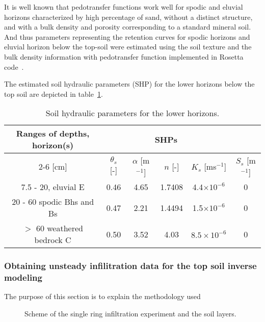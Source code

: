 \documentclass[review]{myarticle}
\begin{document}
It is well known that pedotransfer functions work well for spodic and eluvial horizons characterized by high percentage of sand, without a distinct structure, and with a bulk density and porosity corresponding to a standard mineral soil. And thus parameters representing the retention curves for spodic horizons and eluvial horizon below the top-soil were estimated using the soil texture and the bulk density information with pedotransfer function implemented in Rosetta code~\citep{Schaap}.

The estimated soil hydraulic parameters (SHP) for the lower horizons below the top soil are depicted in table~\ref{tab_SHP}.

\begin{table}[ht]
\begin{center}
\caption{Soil hydraulic parameters for the lower horizons.}
\begin{small}
\doublespacing
\begin{tabular}{c c c c c c}
\toprule
Ranges of depths, horizon(s)&\multicolumn{4}{c}{SHPs}\\ \cline{2-6}
[cm]&$\theta_s$ [-] & $\alpha$ [m$^{-1}$]& $n$ [-]& $K_s$ [ms$^{-1}$] & $S_s$ [m$^{-1}$] \\ \hline
7.5 - 20, eluvial E&0.46&4.65&1.7408&4.4$\times 10^{-6}$ & 0\\
20 - 60 spodic Bhs and Bs&0.47&2.21&1.4494&1.5$\times 10^{-6}$ & 0\\
$>$ 60 weathered bedrock C & 0.50 & 3.52 & 4.03 &  $8.5\times 10^{-6}$ & 0 \\
\toprule
\end{tabular}
\end{small}
\label{tab_SHP}
\end{center}
\end{table}


\subsubsection{Obtaining unsteady infilitration data for the top soil inverse modeling}
The purpose of this section is to explain the methodology used 


 \begin{figure}
\centering
{}
 \caption{Scheme of the single ring infiltration experiment and the soil layers. }
 \label{experiment}
\end{figure}
\end{document}
